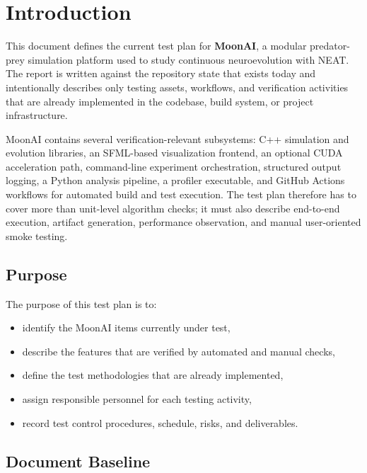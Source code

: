 \section{Introduction}
\label{sec:intro}

This document defines the current test plan for \textbf{MoonAI}, a modular predator-prey
simulation platform used to study continuous neuroevolution with NEAT. The report is
written against the repository state that exists today and intentionally describes only
testing assets, workflows, and verification activities that are already implemented in the
codebase, build system, or project infrastructure.

MoonAI contains several verification-relevant subsystems: C++ simulation and evolution
libraries, an SFML-based visualization frontend, an optional CUDA acceleration path,
command-line experiment orchestration, structured output logging, a Python analysis
pipeline, a profiler executable, and GitHub Actions workflows for automated build and test
execution. The test plan therefore has to cover more than unit-level algorithm checks; it
must also describe end-to-end execution, artifact generation, performance observation, and
manual user-oriented smoke testing.

\subsection{Purpose}

The purpose of this test plan is to:

\begin{itemize}[nosep]
	\item identify the MoonAI items currently under test,
	\item describe the features that are verified by automated and manual checks,
	\item define the test methodologies that are already implemented,
	\item assign responsible personnel for each testing activity,
	\item record test control procedures, schedule, risks, and deliverables.
\end{itemize}

\subsection{Document Baseline}

